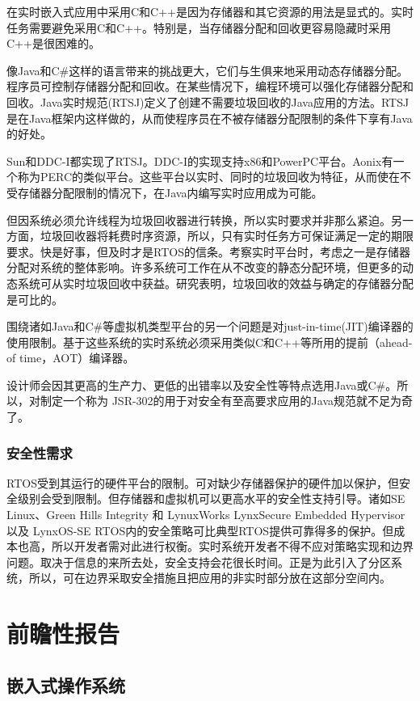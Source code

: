 \documentclass[12pt, a4paper]{article}
\begin{document}
	在实时嵌入式应用中采用C和C++是因为存储器和其它资源的用法是显式的。实时任务需要避免采用C和C++。特别是，当存储器分配和回收更容易隐藏时采用C++是很困难的。
	
	像Java和C\#这样的语言带来的挑战更大，它们与生俱来地采用动态存储器分配。程序员可控制存储器分配和回收。在某些情况下，编程环境可以强化存储器分配和回收。Java实时规范(RTSJ)定义了创建不需要垃圾回收的Java应用的方法。RTSJ是在Java框架内这样做的，从而使程序员在不被存储器分配限制的条件下享有Java的好处。
	
	Sun和DDC-I都实现了RTSJ。DDC-I的实现支持x86和PowerPC平台。Aonix有一个称为PERC的类似平台。这些平台以实时、同时的垃圾回收为特征，从而使在不受存储器分配限制的情况下，在Java内编写实时应用成为可能。
	
	但因系统必须允许线程为垃圾回收器进行转换，所以实时要求并非那么紧迫。另一方面，垃圾回收器将耗费时序资源，所以，只有实时任务方可保证满足一定的期限要求。快是好事，但及时才是RTOS的信条。考察实时平台时，考虑之一是存储器分配对系统的整体影响。许多系统可工作在从不改变的静态分配环境，但更多的动态系统可从实时垃圾回收中获益。研究表明，垃圾回收的效益与确定的存储器分配是可比的。
	
	围绕诸如Java和C\#等虚拟机类型平台的另一个问题是对just-in-time(JIT)编译器的使用限制。基于这些系统的实时系统必须采用类似C和C++等所用的提前（ahead-of time，AOT）编译器。
	
	设计师会因其更高的生产力、更低的出错率以及安全性等特点选用Java或C\#。所以，对制定一个称为 JSR-302的用于对安全有至高要求应用的Java规范就不足为奇了。
	
	\subsubsection{安全性需求}
	RTOS受到其运行的硬件平台的限制。可对缺少存储器保护的硬件加以保护，但安全级别会受到限制。但存储器和虚拟机可以更高水平的安全性支持引导。诸如SE Linux、Green Hills Integrity 和 LynuxWorks LynxSecure Embedded Hypervisor以及 LynxOS-SE RTOS内的安全策略可比典型RTOS提供可靠得多的保护。但成本也高，所以开发者需对此进行权衡。实时系统开发者不得不应对策略实现和边界问题。取决于信息的来所去处，安全支持会花很长时间。正是为此引入了分区系统，所以，可在边界采取安全措施且把应用的非实时部分放在这部分空间内。
	
	\section{前瞻性报告}
	\subsection{嵌入式操作系统}
\end{document}
